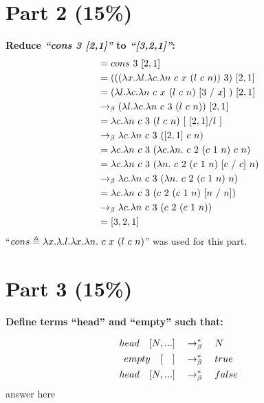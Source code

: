 \documentclass{article}
\begin{document}
	
		
	\section{Part 2 (15\%)}
	
	\begin{Large}
		\textbf{Reduce \textit{``cons 3 [2,1]''} to \textit{``[3,2,1]''}:}
		\begin{align*}
			&= cons \ 3 \ [2,1]  \\
			&= (((\la x.\la l.\la c.\la n \ c \ x \ (l \ c \ n))\ 3) \ [2,1] \\
			&= (\la l.\la c.\la n \ c \ x \ (l \ c \ n) \ [3 \ / \ x] \ ) \ [2,1] \\
			&\equals (\la l.\la c.\la n \ c \ 3 \ (l \ c \ n)) \ [2,1] \\
			&= \la c.\la n \ c \ 3 \ (l \ c \ n) \ [ \ [2,1] / l \ ] \\
			&\equals \la c.\la n \ c \ 3 \ ([2,1] \ c \ n) \\
			&= \la c.\la n \ c \ 3 \ (\la c.\la n. \ c \ 2 \ (c \ 1 \ n) \ c \ n) \\
			&= \la c.\la n \ c \ 3 \ (\la n. \ c \ 2 \ (c \ 1 \ n) \ [c \ / \ c] \ n) \\
			&\equals \la c.\la n \ c \ 3 \ (\la n. \ c \ 2 \ (c \ 1 \ n) \ n) \\
			&= \la c.\la n \ c \ 3 \ ( c \ 2 \ (c \ 1 \ n) \ [n \ / \ n]) \\
			&\equals \la c.\la n \ c \ 3 \ ( c \ 2 \ (c \ 1 \ n)) \\
			&= [3,2,1]
		\end{align*}
		``$cons \triangleq \lambda x.\lambda .l.\lambda x.\lambda n. \ c \ x \ (l \ c \ n)$'' was used for this part.
	\end{Large}
	\newpage
	
	
	
	\section{Part 3 (15\%)}
	\textbf{Define terms ``head'' and ``empty'' such that:}
	
	\begin{Large}
		\begin{align*}
			head \quad [ N, ...] &\quad \rightarrow_\beta^*\quad  N\\
			empty \quad [\quad] &\quad \rightarrow_\beta^*\quad true\\
			head \quad [ N, ...] &\quad \rightarrow_\beta^*\quad false
		\end{align*}
		answer here
	\end{Large}
	\newpage
\end{document}
